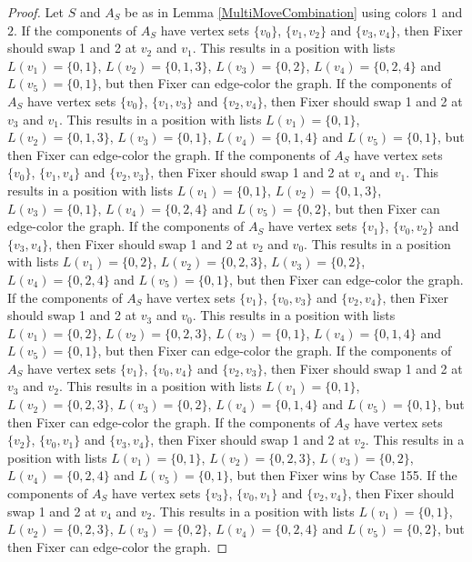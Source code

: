 \documentclass[12pt]{amsart}
\theoremstyle{plain}
\theoremstyle{definition}
\theoremstyle{remark}
\begin{document}
\begin{proof}
Let $S$ and $A_S$ be as in Lemma \ref{MultiMoveCombination} using colors $1$ and $2$. If the components of $A_S$ have vertex sets $\{v_0\}$, $\{v_1, v_2\}$ and $\{v_3, v_4\}$, then Fixer should swap 1 and 2 at $v_2$ and $v_1$. This results in a position with lists $L(v_1) = \{0, 1\}$, $L(v_2) = \{0, 1, 3\}$, $L(v_3) = \{0, 2\}$, $L(v_4) = \{0, 2, 4\}$ and $L(v_5) = \{0, 1\}$, but then Fixer can edge-color the graph.
If the components of $A_S$ have vertex sets $\{v_0\}$, $\{v_1, v_3\}$ and $\{v_2, v_4\}$, then Fixer should swap 1 and 2 at $v_3$ and $v_1$. This results in a position with lists $L(v_1) = \{0, 1\}$, $L(v_2) = \{0, 1, 3\}$, $L(v_3) = \{0, 1\}$, $L(v_4) = \{0, 1, 4\}$ and $L(v_5) = \{0, 1\}$, but then Fixer can edge-color the graph.
If the components of $A_S$ have vertex sets $\{v_0\}$, $\{v_1, v_4\}$ and $\{v_2, v_3\}$, then Fixer should swap 1 and 2 at $v_4$ and $v_1$. This results in a position with lists $L(v_1) = \{0, 1\}$, $L(v_2) = \{0, 1, 3\}$, $L(v_3) = \{0, 1\}$, $L(v_4) = \{0, 2, 4\}$ and $L(v_5) = \{0, 2\}$, but then Fixer can edge-color the graph.
If the components of $A_S$ have vertex sets $\{v_1\}$, $\{v_0, v_2\}$ and $\{v_3, v_4\}$, then Fixer should swap 1 and 2 at $v_2$ and $v_0$. This results in a position with lists $L(v_1) = \{0, 2\}$, $L(v_2) = \{0, 2, 3\}$, $L(v_3) = \{0, 2\}$, $L(v_4) = \{0, 2, 4\}$ and $L(v_5) = \{0, 1\}$, but then Fixer can edge-color the graph.
If the components of $A_S$ have vertex sets $\{v_1\}$, $\{v_0, v_3\}$ and $\{v_2, v_4\}$, then Fixer should swap 1 and 2 at $v_3$ and $v_0$. This results in a position with lists $L(v_1) = \{0, 2\}$, $L(v_2) = \{0, 2, 3\}$, $L(v_3) = \{0, 1\}$, $L(v_4) = \{0, 1, 4\}$ and $L(v_5) = \{0, 1\}$, but then Fixer can edge-color the graph.
If the components of $A_S$ have vertex sets $\{v_1\}$, $\{v_0, v_4\}$ and $\{v_2, v_3\}$, then Fixer should swap 1 and 2 at $v_3$ and $v_2$. This results in a position with lists $L(v_1) = \{0, 1\}$, $L(v_2) = \{0, 2, 3\}$, $L(v_3) = \{0, 2\}$, $L(v_4) = \{0, 1, 4\}$ and $L(v_5) = \{0, 1\}$, but then Fixer can edge-color the graph.
If the components of $A_S$ have vertex sets $\{v_2\}$, $\{v_0, v_1\}$ and $\{v_3, v_4\}$, then Fixer should swap 1 and 2 at $v_2$. This results in a position with lists $L(v_1) = \{0, 1\}$, $L(v_2) = \{0, 2, 3\}$, $L(v_3) = \{0, 2\}$, $L(v_4) = \{0, 2, 4\}$ and $L(v_5) = \{0, 1\}$, but then Fixer wins by Case 155.
If the components of $A_S$ have vertex sets $\{v_3\}$, $\{v_0, v_1\}$ and $\{v_2, v_4\}$, then Fixer should swap 1 and 2 at $v_4$ and $v_2$. This results in a position with lists $L(v_1) = \{0, 1\}$, $L(v_2) = \{0, 2, 3\}$, $L(v_3) = \{0, 2\}$, $L(v_4) = \{0, 2, 4\}$ and $L(v_5) = \{0, 2\}$, but then Fixer can edge-color the graph.

\end{proof}
\end{document}
